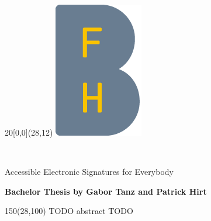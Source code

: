 %
%

\begin{titlepage}


\setlength{\unitlength}{1mm}
\begin{textblock}{20}[0,0](28,12)
	\includegraphics[scale=1.0]{images/BFH_Logo_B.png}
\end{textblock}

\begin{flushleft}

\vspace*{21mm}

\fontsize{26pt}{40pt}\selectfont 
\heading				\\							%
\vspace{2mm}

\fontsize{16pt}{24pt}\selectfont\vspace{0.3em}
Accessible Electronic Signatures for Everybody 			\\				%
\vspace{5mm}

\fontsize{10pt}{12pt}\selectfont
\textbf{Bachelor Thesis by Gabor Tanz and Patrick Hirt} \\		%
\vspace{7mm}

\begin{textblock}{150}(28,100)
\fontsize{10pt}{12pt}\selectfont
    TODO abstract TODO
\end{textblock}


\end{flushleft}
\end{titlepage}
